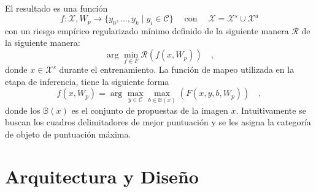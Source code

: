 El resultado es una función \[f : \mathcal{X}, W_p  \to \{y_0,...,y_k\mid y_i \in \mathcal{C}\} \quad \operatorname{con}\quad \mathcal{X} =  \mathcal{X}^s \cup \mathcal{X}^u\] con un riesgo empírico regularizado mínimo definido de la siguiente manera $\mathcal{R}$ de la siguiente manera: \[ \arg_{}\min_{f \in F} \mathcal{R}(f(x,W_p))\quad, \] donde $x \in \mathcal{X}^s$ durante el entrenamiento. La función de mapeo utilizada en la etapa de inferencia, tiene la siguiente forma \[ f(x,W_p) = \arg_{}\max_{y \in \mathcal{C}}\max_{b \in \mathbb{B}(x)} (F(x,y,b,W_p)) \quad,\] donde los $\mathbb{B}(x)$ es el conjunto de propuestas de la imagen $x$. Intuitivamente se buscan los cuadros delimitadores de mejor puntuación y se les asigna la categoría de objeto de puntuación máxima.

\section{Arquitectura y Diseño} \label{sec:arquitecturaydiseno}

